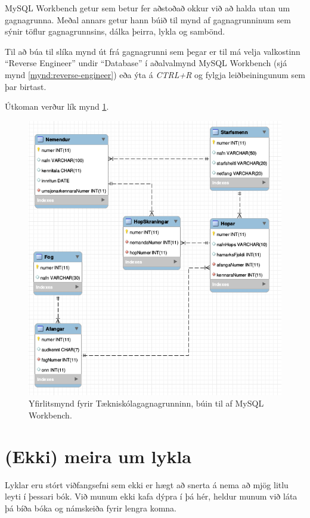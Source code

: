MySQL Workbench getur sem betur fer aðstoðað okkur við að halda utan um gagnagrunna. Meðal annars getur hann búið til mynd af gagnagrunninum sem sýnir töflur gagnagrunnsins, dálka þeirra, lykla og sambönd.

Til að búa til slíka mynd út frá gagnagrunni sem þegar er til má velja valkostinn ``Reverse Engineer'' undir ``Database'' í aðalvalmynd MySQL Workbench (sjá mynd \ref{mynd:reverse-engineer}) eða ýta á \emph{CTRL+R} og fylgja leiðbeiningunum sem þar birtast. 

Útkoman verður lík mynd \ref{mynd:eer}.
\begin{figure}
\caption[Tækniskólagagnagrunnurinn]{Yfirlitsmynd fyrir Tækniskólagagnagrunninn, búin til af MySQL Workbench.}
\label{mynd:eer}
\centering
\includegraphics[width=\linewidth]{myndir/workbench-eer}
\end{figure}

\newpage
\section{(Ekki) meira um lykla}
Lyklar eru stórt viðfangsefni sem ekki er hægt að snerta á nema að mjög litlu leyti í þessari bók. Við munum ekki kafa dýpra í þá hér, heldur munum við láta þá bíða bóka og námskeiða fyrir lengra komna.
